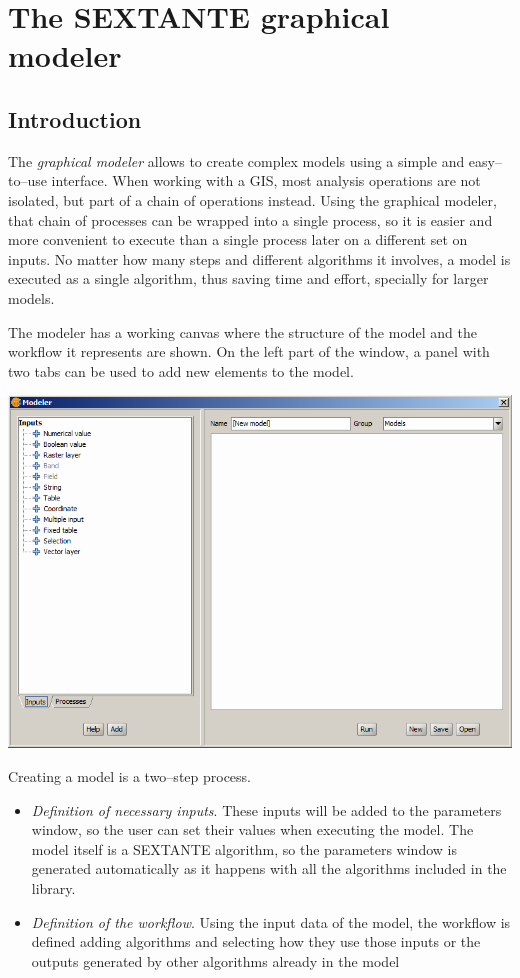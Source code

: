 \chapter{The SEXTANTE graphical modeler}

\section{Introduction}

The \emph{graphical modeler} allows to create complex models using a simple and easy--to--use interface. When working with a GIS, most analysis operations are not isolated, but part of a chain of operations instead. Using the graphical modeler, that chain of processes can be wrapped into a single process, so it is easier and more convenient to execute than a single process later on a different set on inputs. No matter how many steps and different algorithms it involves, a model is executed as a single algorithm, thus saving time and effort, specially for larger models.

The modeler has a working canvas where the structure of the model and the workflow it represents are shown. On the left part of the window, a panel with two tabs can be used to add new elements to the model.

\begin{center}
\includegraphics[width=.8\columnwidth]{graphical_modeler.png}
\end{center}

Creating a model is a two--step process.

\begin{itemize}
	\item \emph{Definition of necessary inputs}. These inputs will be added to the parameters window, so the user can set their values when executing the model. The model itself is a SEXTANTE algorithm, so the parameters window is generated automatically as it happens with all the algorithms included in the library.
	\item \emph{Definition of the workflow}. Using the input data of the model, the workflow is defined adding algorithms and selecting how they use those inputs or the outputs generated by other algorithms already in the model 
\end{itemize}


